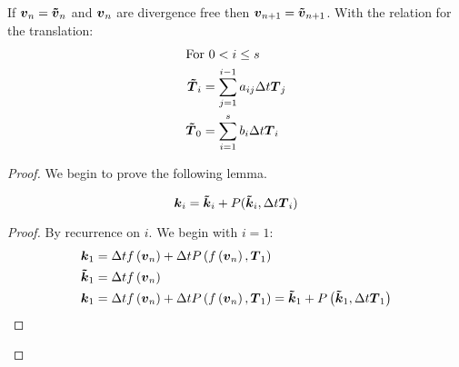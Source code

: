 \begin{theorem}
If ${\boldsymbol {v}}_{n}={\boldsymbol {\tilde{v}}}_{n}$ and ${\boldsymbol {v}}_n$ are divergence free then ${\boldsymbol {v}}_{n+1}={\boldsymbol {\tilde{v}}}_{n+1}$.
With the relation for the translation:
\begin{align}
\intertext{For $0< i\leq s$}
  {\boldsymbol {\tilde{T}}}_i&=\sum_{j=1}^{i-1}a_{ij}\Delta t {\boldsymbol {T}}_{j}\\
  {\boldsymbol {\tilde{T}}}_0&=\sum_{i=1}^{s}b_{i}\Delta t {\boldsymbol {T}}_{i}
\end{align}

\end{theorem}
\begin{proof}
We begin to prove the following lemma.
\begin{lemma}
\begin{equation}
  {\boldsymbol {k}}_{i}={\boldsymbol {\tilde{k}}}_{i}+P({\boldsymbol {\tilde{k}}}_{i},\Delta t {\boldsymbol {T}}_{i})
\end{equation}
\end{lemma}
\begin{proof}
By recurrence on $i$.
We begin with $i=1$:
\begin{align}
  {\boldsymbol {k}}_{1}&=\Delta tf\left({\boldsymbol {v}}_n\right)+\Delta tP\left(f\left({\boldsymbol {v}}_n\right),{\boldsymbol {T}}_{1}\right)\\
{\boldsymbol {\tilde{k}}}_{1}&=\Delta tf\left({\boldsymbol {{\boldsymbol {v}}}}_n\right)\\
  {\boldsymbol {k}}_{1}&=\Delta t f\left({\boldsymbol {v}}_n\right)+\Delta tP\left(f\left({\boldsymbol {v}}_n\right),{\boldsymbol {T}}_{1}\right)={\boldsymbol {\tilde{k}}}_1+P\left({\boldsymbol {\tilde{k}}}_1,\Delta t {\boldsymbol {T}}_{1}\right)
\end{align}


\end{proof}
\end{proof}
